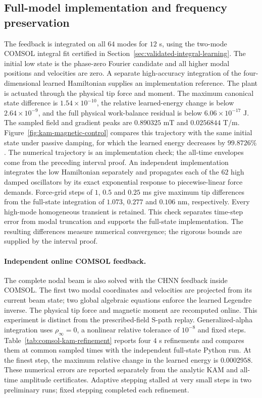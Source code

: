 \subsection{Full-model implementation and frequency preservation}
\label{sec:kam-control-experiment}
The feedback is integrated on all $64$ modes for $12$ s, using the
two-mode COMSOL integral fit certified in
Section~\ref{sec:validated-integral-learning}. The initial low state is
the phase-zero Fourier candidate and all higher modal positions and
velocities are zero. A separate high-accuracy integration of the
four-dimensional learned Hamiltonian supplies an implementation
reference. The plant is actuated through the physical tip force and moment.
The maximum canonical state difference is $1.54\times10^{-10}$,
the relative learned-energy change is below $2.64\times10^{-9}$,
and the full physical work-balance residual is below
$6.06\times10^{-17}$ J. The sampled field and gradient peaks are
$0.890325$ mT and $0.0256844$ T/m. Figure~\ref{fig:kam-magnetic-control}
compares this trajectory with the same initial state under passive
damping, for which the learned energy decreases by $99.8726\%$.
The numerical trajectory is an implementation check; the all-time
envelopes come from the preceding interval proof.
An independent implementation integrates the low Hamiltonian separately
and propagates each of the $62$ high damped oscillators by its exact
exponential response to piecewise-linear force demands. Force-grid
steps of $1$, $0.5$ and $0.25$ ms give maximum tip differences from the
full-state integration of $1.073$, $0.277$ and $0.106$ nm, respectively.
Every high-mode homogeneous transient is retained. This check separates
time-step error from modal truncation and supports the full-state
implementation. The resulting differences measure numerical convergence;
the rigorous bounds are supplied by the interval proof.

\paragraph{Independent online COMSOL feedback.}
The complete nodal beam is also solved with the CHNN feedback inside
COMSOL. The first two modal coordinates and velocities are projected
from its current beam state; two global algebraic equations enforce
the learned Legendre inverse. The physical tip force and magnetic
moment are recomputed online. This experiment is distinct from the
prescribed-field S-path replay.
Generalized-alpha integration uses $\rho_\infty=0$, a nonlinear relative
tolerance of $10^{-8}$ and fixed steps. Table~\ref{tab:comsol-kam-refinement}
reports four $4$ s refinements and compares them at common sampled
times with the independent full-state Python run.
At the finest step, the maximum relative change in the learned energy
is $0.0002958$. These numerical
errors are reported separately from the analytic KAM and all-time
amplitude certificates. Adaptive stepping stalled at very small steps
in two preliminary runs; fixed stepping completed each refinement.

